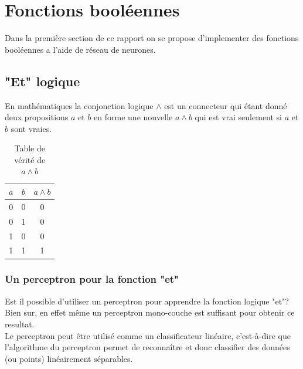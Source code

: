 \documentclass[twoside,openright,a4paper,11pt,french]{article}
\begin{document}
\pagestyle{plain}
\setlength{\parindent}{0pt}



\parskip=0pt
\tableofcontents
\clearpage


\vspace{5cm}


\section{Fonctions booléennes}

Dans la première section de ce rapport on se propose
d'implementer des fonctions booléennes a l'aide de réseau
de neurones. 

\subsection{"Et" logique}

En mathématiques la conjonction logique $\land$ est un
connecteur qui étant donné deux propositions $a$ et $b$
en forme une nouvelle $a \land b$ qui est vrai seulement
si $a$ et $b$ sont vraies.

\begin{table}[ht]
  \centering
  \begin{tabular}{| c | c | c |}
    \hline
    \textbf{$a$} & \textbf{$b$} & \textbf{$a \land b$}\\
    \hline
    0 & 0  & 0 \\
    \hline
    0 & 1  & 0 \\
    \hline
    1 & 0  & 0 \\
    \hline
    1 & 1  & 1 \\
    \hline
  \end{tabular}
  \caption{Table de vérité de $a \land b$}
  \label{tab:et}
\end{table}




\subsubsection{Un perceptron pour la fonction "et"} 

Est il possible d'utiliser un perceptron pour apprendre la fonction logique
"et"? Bien sur, en effet même un perceptron mono-couche est suffisant pour
obtenir ce resultat.\\

Le perceptron peut être utilisé comme un classificateur linéaire, c'est-à-dire que l'algorithme du
perceptron permet de reconnaître et donc classifier des données (ou points)
linéairement séparables.\\
\end{document}
